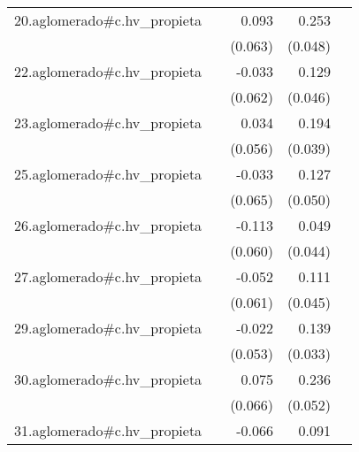 {\begin{longtable}{l*{4}{D{.}{.}{-1}}}
\addlinespace
20.aglomerado#c.hv\_propieta&                     &       0.093         &       0.253\sym{***}&                     \\
            &                     &     (0.063)         &     (0.048)         &                     \\
\addlinespace
22.aglomerado#c.hv\_propieta&                     &      -0.033         &       0.129\sym{**} &                     \\
            &                     &     (0.062)         &     (0.046)         &                     \\
\addlinespace
23.aglomerado#c.hv\_propieta&                     &       0.034         &       0.194\sym{***}&                     \\
            &                     &     (0.056)         &     (0.039)         &                     \\
\addlinespace
25.aglomerado#c.hv\_propieta&                     &      -0.033         &       0.127\sym{*}  &                     \\
            &                     &     (0.065)         &     (0.050)         &                     \\
\addlinespace
26.aglomerado#c.hv\_propieta&                     &      -0.113         &       0.049         &                     \\
            &                     &     (0.060)         &     (0.044)         &                     \\
\addlinespace
27.aglomerado#c.hv\_propieta&                     &      -0.052         &       0.111\sym{*}  &                     \\
            &                     &     (0.061)         &     (0.045)         &                     \\
\addlinespace
29.aglomerado#c.hv\_propieta&                     &      -0.022         &       0.139\sym{***}&                     \\
            &                     &     (0.053)         &     (0.033)         &                     \\
\addlinespace
30.aglomerado#c.hv\_propieta&                     &       0.075         &       0.236\sym{***}&                     \\
            &                     &     (0.066)         &     (0.052)         &                     \\
\addlinespace
31.aglomerado#c.hv\_propieta&                     &      -0.066         &       0.091         &                     \\

\end{longtable}}
